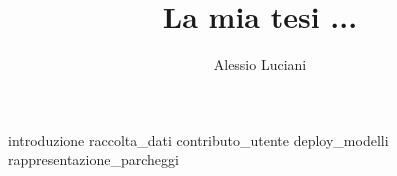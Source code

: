 \documentclass[binding=0.6cm,TFA]{sapthesis}
\title{La mia tesi ...} \author{Alessio Luciani}
\begin{document}
\frontmatter
\maketitle
\dedication{Alla mia famiglia}
\tableofcontents
\mainmatter
\Large
{introduzione}
{raccolta_dati}
{contributo_utente}
{deploy_modelli}
{rappresentazione_parcheggi}
\backmatter
\cleardoublepage
{} %
\end{document}
